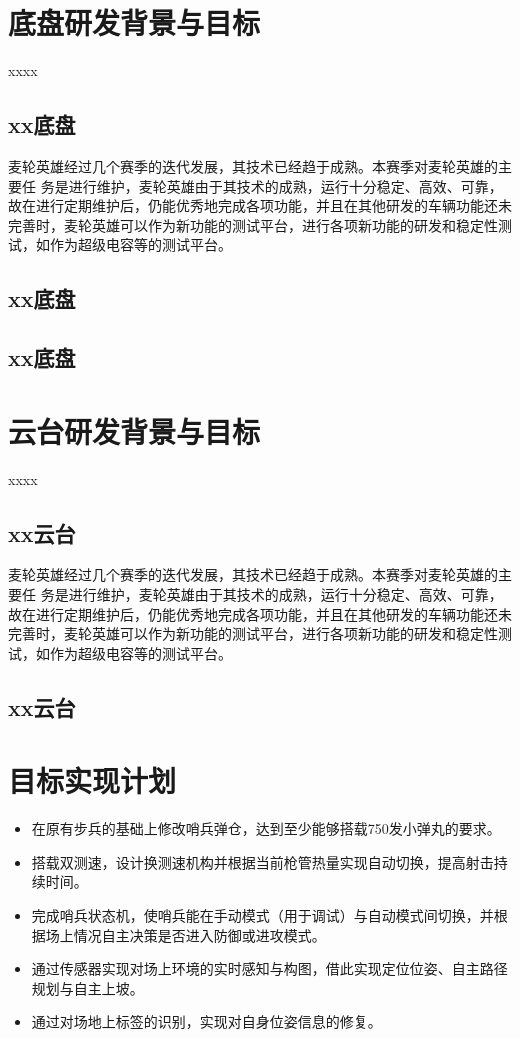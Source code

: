 \section{底盘研发背景与目标}
xxxx
\subsection{xx底盘}
麦轮英雄经过几个赛季的迭代发展，其技术已经趋于成熟。本赛季对麦轮英雄的主要任
务是进行维护，麦轮英雄由于其技术的成熟，运行十分稳定、高效、可靠，故在进行定期维护后，仍能优秀地完成各项功能，并且在其他研发的车辆功能还未完善时，麦轮英雄可以作为新功能的测试平台，进行各项新功能的研发和稳定性测试，如作为超级电容等的测试平台。

\subsection{xx底盘}

\subsection{xx底盘}


\section{云台研发背景与目标}
xxxx
\subsection{xx云台}
麦轮英雄经过几个赛季的迭代发展，其技术已经趋于成熟。本赛季对麦轮英雄的主要任
务是进行维护，麦轮英雄由于其技术的成熟，运行十分稳定、高效、可靠，故在进行定期维护后，仍能优秀地完成各项功能，并且在其他研发的车辆功能还未完善时，麦轮英雄可以作为新功能的测试平台，进行各项新功能的研发和稳定性测试，如作为超级电容等的测试平台。

\subsection{xx云台}


\section{目标实现计划}
\begin{itemize}
    \item 在原有步兵的基础上修改哨兵弹仓，达到至少能够搭载750发小弹丸的要求。
    \item 搭载双测速，设计换测速机构并根据当前枪管热量实现自动切换，提高射击持续时间。
    \item 完成哨兵状态机，使哨兵能在手动模式（用于调试）与自动模式间切换，并根据场上情况自主决策是否进入防御或进攻模式。
    \item 通过传感器实现对场上环境的实时感知与构图，借此实现定位位姿、自主路径规划与自主上坡。
    \item 通过对场地上标签的识别，实现对自身位姿信息的修复。
\end{itemize} 
   
